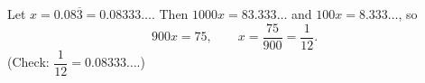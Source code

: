 Let $x=0.08\overline3=0.08333\ldots$. Then $1000x=83.333\ldots$ and $100x=8.333\ldots$, so
\[900x=75,\qquad x=\dfrac{75}{900}=\boxed{\dfrac{1}{12}} .\]
(Check: $\dfrac{1}{12}=0.08333\ldots$.)
